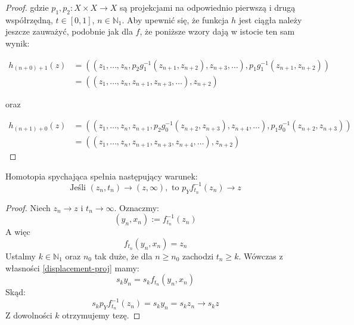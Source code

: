 \begin{thm}
\begin{proof}
    gdzie $p_1, p_2:  X \times X \rightarrow X$ są projekcjami na odpowiednio pierwszą i drugą współrzędną, $t \in [0,1]$, $n \in \mathbb{N}_1$. Aby upewnić się, że funkcja $h$ jest ciągła należy jeszcze zauważyć, podobnie jak dla $f$, że poniższe wzory dają w istocie ten sam wynik:
    
    \begin{align*}
    h_{(n+0)+1}(z) &= ((z_1, \ldots, z_n, p_2 g_1^{-1}(z_{n+1}, z_{n+2}), z_{n+3}, \ldots), p_1 g_1^{-1}(z_{n+1}, z_{n+2})) \\
    &= ((z_1, \ldots, z_n, z_{n+1}, z_{n+3}, \ldots), z_{n+2})
    \end{align*}
    
    oraz
    
    \begin{align*}
    h_{(n+1)+0}(z) &= ((z_1, \ldots, z_n, z_{n+1}, p_2 g_0^{-1}(z_{n+2}, z_{n+3}), z_{n+4}, \ldots), p_1 g_0^{-1}(z_{n+2}, z_{n+3})) \\
    &= ((z_1, \ldots, z_n, z_{n+1}, z_{n+3}, z_{n+4}, \ldots), z_{n+2})
    \end{align*}

  \end{proof}
\end{thm}


\begin{prop}
  Homotopia spychająca spełnia następujący warunek:
  \[\mbox{Jeśli } (z_n, t_n) \rightarrow (z, \infty), \mbox{ to } p_Y f_{t_n}^{-1}(z_n) \rightarrow z\]
  \begin{proof}
    Niech $z_n \rightarrow z$ i $t_n \rightarrow \infty$. Oznaczmy:
    \[(y_n, x_n) := f_{t_n}^{-1}(z_n)\]
    A więc
    \[f_{t_n}(y_n, x_n) = z_n\]
    Ustalmy $k \in \mathbb{N}_1$ oraz $n_0$ tak duże, że dla $n \geq n_0$ zachodzi $t_n \geq k$. Wówczas z własności \ref{displacement-proj} mamy:
    \[s_k y_n = s_k f_{t_n}(y_n, x_n)\]
    Skąd:
    \[s_k p_Y f_{t_n}^{-1}(z_n) = s_k y_n = s_k z_n \rightarrow s_k z\]
    Z dowolności $k$ otrzymujemy tezę.
  \end{proof}
\end{prop}

